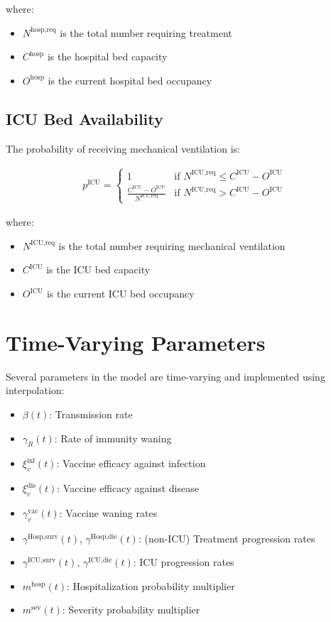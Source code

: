 \documentclass[12pt]{article}
\begin{document}
where:
\begin{itemize}
    \item $N^{\text{hosp,req}}$ is the total number requiring treatment
    \item $C^{\text{hosp}}$ is the hospital bed capacity
    \item $O^{\text{hosp}}$ is the current hospital bed occupancy
\end{itemize}

\subsection{ICU Bed Availability}

The probability of receiving mechanical ventilation is:

\begin{align*}
p^{\text{ICU}} = \begin{cases}
1 & \text{if } N^{\text{ICU,req}} \leq C^{\text{ICU}} - O^{\text{ICU}} \\
\frac{C^{\text{ICU}} - O^{\text{ICU}}}{N^{\text{ICU,req}}} & \text{if } N^{\text{ICU,req}} > C^{\text{ICU}} - O^{\text{ICU}}
\end{cases}
\end{align*}

where:
\begin{itemize}
    \item $N^{\text{ICU,req}}$ is the total number requiring mechanical ventilation
    \item $C^{\text{ICU}}$ is the ICU bed capacity
    \item $O^{\text{ICU}}$ is the current ICU bed occupancy
\end{itemize}

\section{Time-Varying Parameters}

Several parameters in the model are time-varying and implemented using interpolation:

\begin{itemize}
    \item $\beta(t)$: Transmission rate
    \item $\gamma_R(t)$: Rate of immunity waning
    \item $\xi^{\text{inf}}_v(t)$: Vaccine efficacy against infection
    \item $\xi^{\text{dis}}_v(t)$: Vaccine efficacy against disease
    \item $\gamma^{\text{vac}}_v(t)$: Vaccine waning rates
    \item $\gamma^{\text{Hosp,surv}}(t)$, $\gamma^{\text{Hosp,die}}(t)$: (non-ICU) Treatment progression rates
    \item $\gamma^{\text{ICU,surv}}(t)$, $\gamma^{\text{ICU,die}}(t)$: ICU progression rates
    \item $m^{\text{hosp}}(t)$: Hospitalization probability multiplier
    \item $m^{\text{sev}}(t)$: Severity probability multiplier
\end{itemize}
\end{document}

